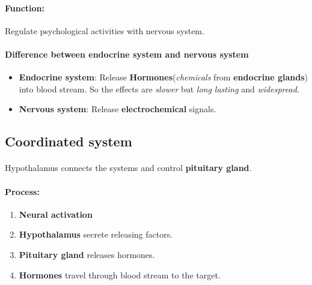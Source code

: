 \documentclass{article}
\begin{document}
	\paragraph{Function:} Regulate psychological activities with nervous system.
	\paragraph{Difference between endocrine system and nervous system}
	\begin{itemize}
		\item \textbf{Endocrine system}: Release \textbf{Hormones}(\emph{chemicals} from \textbf{endocrine glands}) into blood stream. So the effects are \emph{slower} but \emph{long lasting} and \emph{widespread}.
		\item \textbf{Nervous system}: Release \textbf{electrochemical} signals.
	\end{itemize}
	\subsection{Coordinated system}
	\paragraph{} Hypothalamus connects the systems and control \textbf{pituitary gland}.
	\paragraph{Process:}
	\begin{enumerate}
		\item \textbf{Neural activation}
		\item \textbf{Hypothalamus} secrete releasing factors.
		\item \textbf{Pituitary gland} releases hormones.
		\item \textbf{Hormones} travel through blood stream to the target.
	\end{enumerate}
\end{document}
